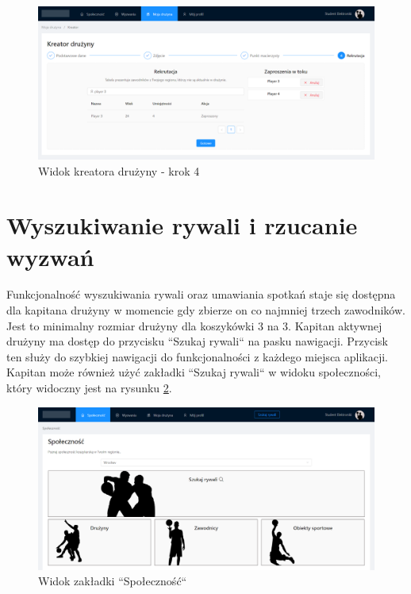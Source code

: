 \begin{figure}[H]
\centering
\includegraphics[width=\linewidth]{065-dzialanie/rys/ss-team-5.PNG}
\caption{Widok kreatora drużyny - krok 4}
\label{fig:ss-team-5}
\end{figure}

\section{Wyszukiwanie rywali i rzucanie wyzwań}

Funkcjonalność wyszukiwania rywali oraz umawiania spotkań staje się dostępna dla kapitana drużyny w momencie gdy zbierze on co najmniej trzech zawodników. Jest to minimalny rozmiar drużyny dla koszykówki 3 na 3. Kapitan aktywnej drużyny ma dostęp do przycisku ``Szukaj rywali`` na pasku nawigacji. Przycisk ten służy do szybkiej nawigacji do funkcjonalności z każdego miejsca aplikacji. Kapitan może również użyć zakładki ``Szukaj rywali`` w widoku społeczności, który widoczny jest na rysunku \ref{fig:ss-search-0}. 

\begin{figure}[H]
\centering
\includegraphics[width=\linewidth]{065-dzialanie/rys/ss-search-0.PNG}
\caption{Widok zakładki ``Społeczność``}
\label{fig:ss-search-0}
\end{figure}


